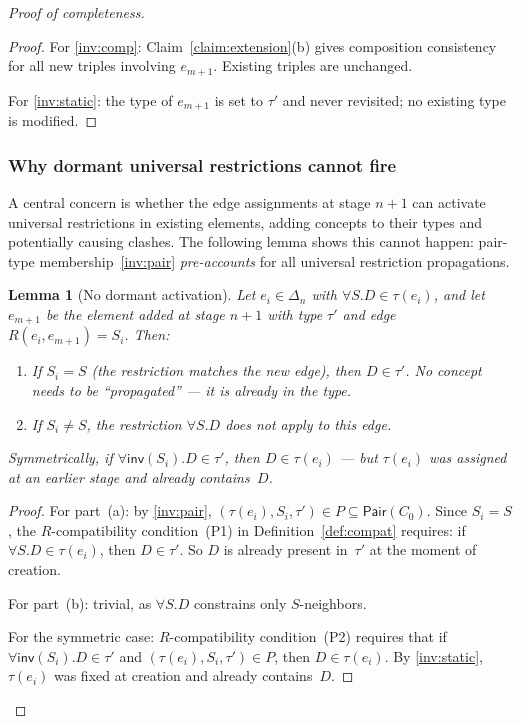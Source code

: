 \documentclass[a4paper,11pt]{article}
\newtheorem{lemma}[theorem]{Lemma}
\theoremstyle{definition}
\newcommand{\inv}{\ensuremath{\mathsf{inv}}}
\newcommand{\Pair}{\ensuremath{\mathsf{Pair}}}
\begin{document}
\begin{proof}[Proof of completeness]
\begin{proof}
For \ref{inv:comp}: Claim~\ref{claim:extension}(b) gives composition
consistency for all new triples involving $e_{m+1}$.  Existing triples
are unchanged.

For \ref{inv:static}: the type of $e_{m+1}$ is set to $\tau'$ and
never revisited; no existing type is modified.
\end{proof}

\subsubsection*{Why dormant universal restrictions cannot fire}

A central concern is whether the edge assignments at stage $n+1$ can
activate universal restrictions in existing elements, adding concepts
to their types and potentially causing clashes.  The following lemma
shows this cannot happen: pair-type membership~\ref{inv:pair}
\emph{pre-accounts} for all universal restriction propagations.

\begin{lemma}[No dormant activation]
\label{lem:dormant}
Let $e_i \in \Delta_n$ with $\forall S.D \in \tau(e_i)$, and let
$e_{m+1}$ be the element added at stage $n+1$ with type $\tau'$ and
edge $R(e_i, e_{m+1}) = S_i$.  Then:
\begin{enumerate}[label=\textup{(\alph*)},nosep]
  \item If $S_i = S$ \textup{(}the restriction matches the new
    edge\textup{)}, then $D \in \tau'$.  No concept needs to be
    ``propagated'' --- it is already in the type.
  \item If $S_i \neq S$, the restriction $\forall S.D$ does not apply
    to this edge.
\end{enumerate}
Symmetrically, if $\forall \inv(S_i).D \in \tau'$, then $D \in
\tau(e_i)$ --- but $\tau(e_i)$ was assigned at an earlier stage and
already contains~$D$.
\end{lemma}

\begin{proof}
For part~(a): by \ref{inv:pair}, $(\tau(e_i), S_i, \tau') \in P
\subseteq \Pair(C_0)$.  Since $S_i = S$, the $R$-compatibility
condition~(P1) in Definition~\ref{def:compat} requires: if $\forall
S.D \in \tau(e_i)$, then $D \in \tau'$.  So $D$ is already present
in~$\tau'$ at the moment of creation.

For part~(b): trivial, as $\forall S.D$ constrains only $S$-neighbors.

For the symmetric case: $R$-compatibility condition~(P2) requires that
if $\forall \inv(S_i).D \in \tau'$ and $(\tau(e_i), S_i, \tau') \in
P$, then $D \in \tau(e_i)$.  By \ref{inv:static}, $\tau(e_i)$ was
fixed at creation and already contains~$D$.
\end{proof}


\end{proof}
\end{document}
